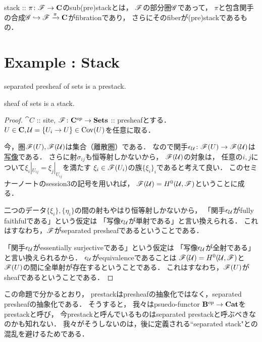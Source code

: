 \documentclass[a4paper]{jsarticle}
\begin{document}
\begin{Def}
    stack :: $\pi \colon \mathscr{F} \to \mathbf{C}$のsub(pre)stackとは，
    $\mathscr{F}$の部分圏$\mathscr{G}$であって，
    $\pi$と包含関手の合成$\mathscr{G} \hookrightarrow \mathscr{F} \xrightarrow{\pi} \mathbf{C}$がfibrationであり，
    さらにそのfiberが(pre)stackであるもの．
\end{Def}

\section{Example : Stack}
\begin{Prop}
    \begin{myenum}
        \item separated presheaf of sets is a prestack.
        \item sheaf of sets is a stack.
    \end{myenum}
\end{Prop}
\begin{proof}
    $\cat{C}$ :: site, $\mathscr{F} \colon \mathbf{C}^{op} \to \mathbf{Sets}$ :: presheafとする．
    $U \in \mathbf{C}, \mathcal{U}=\{U_i \to U\} \in \operatorname{Cov}(U)$を任意に取る．

    今，圏$\mathscr{F}(U), \mathscr{F}(\mathcal{U})$は集合（離散圏）である．
    なので関手$\epsilon_{\mathcal{U}} \colon \mathscr{F}(U) \to \mathscr{F}(\mathcal{U})$は\underline{写像}である．
    さらに射$\sigma_{ij}$も恒等射しかないから，
    $\mathscr{F}(\mathcal{U})$の対象は，
    任意の$i,j$について$\xi_i|_{U_{ij}}=\xi_j|_{U_{ij}}$を満たす
    $\xi_i \in \mathscr{F}(U_i)$の族$\{\xi_i\}_i$であると考えて良い．
    このセミナーノートのsession3の記号を用いれば，
    $\mathscr{F}(\mathcal{U})=H^0(\mathcal{U}, \mathscr{F})$ということに成る．

    二つのデータ$\{\xi_i\}, \{\eta_i\}$の間の射もやはり恒等射しかないから，
    「関手$\epsilon_{\mathcal{U}}$がfully faithfulである」という仮定は
    「写像$\epsilon_{\mathcal{U}}$が単射である」と言い換えられる．
    これはすなわち，$\mathscr{F}$がseparated presheafであるということである．

    「関手$\epsilon_{\mathcal{U}}$がessentially surjectiveである」という仮定は
    「写像$\epsilon_{\mathcal{U}}$が全射である」と言い換えられるから．
    $\epsilon_{\mathcal{U}}$がequivalenceであることは
    $\mathscr{F}(\mathcal{U})=H^0(\mathcal{U}, \mathscr{F})$と$\mathscr{F}(U)$の間に全単射が存在するということである．
    これはすなわち，$\mathscr{F}(U)$がsheafであるということである．
\end{proof}

\begin{Remark}
    この命題で分かるとおり，
    prestackはpresheafの抽象化ではなく，separated presheafの抽象化である．
    そうすると，
    我々はpsuedo-functor $\mathbf{B}^{op} \to \mathbf{Cat}$をprestackと呼び，
    今prestackと呼んでいるものはseparated prestackと呼ぶべきなのかも知れない．
    我々がそうしないのは，後に定義される``separated stack"との混乱を避けるためである．
\end{Remark}
\end{document}
